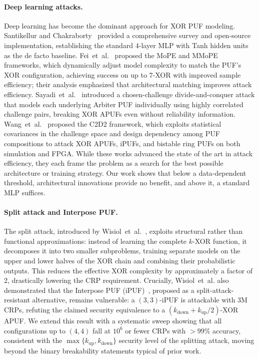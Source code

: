\paragraph{Deep learning attacks.}
Deep learning has become the dominant approach for XOR PUF modeling.
Santikellur and Chakraborty~\cite{santikellur2023} provided a comprehensive
survey and open-source implementation, establishing the standard 4-layer MLP
with Tanh hidden units as the de facto baseline.  Fei~et~al.~\cite{fei2024mope}
proposed the MoPE and MMoPE frameworks, which dynamically adjust model
complexity to match the PUF's XOR configuration, achieving success on up to
7-XOR with improved sample efficiency; their analysis emphasized that
architectural matching improves attack efficiency.  Sayadi~et~al.~\cite{sayadi2025}
introduced a chosen-challenge divide-and-conquer attack that models each
underlying Arbiter PUF individually using highly correlated challenge pairs,
breaking XOR APUFs even without reliability information.  Wang~et~al.~\cite{wang2024c2d2}
proposed the C2D2 framework, which exploits statistical covariances in the
challenge space and design dependency among PUF compositions to attack XOR
APUFs, iPUFs, and bistable ring PUFs on both simulation and FPGA.  While these
works advanced the state of the art in attack efficiency, they each frame the
problem as a search for the best possible architecture or training strategy.
Our work shows that below a data-dependent threshold, architectural
innovations provide no benefit, and above it, a standard MLP suffices.

\paragraph{Split attack and Interpose PUF.}
The split attack, introduced by Wisiol~et~al.~\cite{wisiol2020splitting}, exploits
structural rather than functional approximations: instead of learning the
complete $k$-XOR function, it decomposes it into two smaller
subproblems, training separate models on the upper and lower halves of the XOR
chain and combining their probabilistic outputs.  This reduces the effective
XOR complexity by approximately a factor of 2, drastically lowering the CRP
requirement.  Crucially, Wisiol~et~al. also demonstrated that the Interpose PUF
(iPUF)~\cite{nguyen2019}, proposed as a split-attack-resistant alternative,
remains vulnerable: a $(3,3)$-iPUF is attackable with 3M CRPs, refuting the
claimed security equivalence to a $(k_{\text{down}}+k_{\text{up}}/2)$-XOR
APUF.  We extend this result with
a systematic sweep showing that all configurations up to
$(4,4)$ fall at $10^6$ or fewer CRPs with $>99\%$ accuracy, consistent with the
$\max\{k_{\text{up}},k_{\text{down}}\}$ security level of the splitting attack,
moving beyond
the binary breakability statements typical of prior work.


